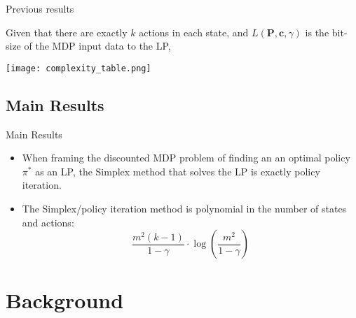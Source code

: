 \documentclass{beamer}
\renewcommand{\vec}[1]{\mathbf{#1}}
\begin{document}
\begin{frame}{Previous results}

Given that there are exactly $k$ actions in each state, and $L(\vec{P},\vec{c},\gamma)$ is the bit-size of the MDP input data to the LP, 
\begin{center}
\texttt{[image: complexity\_table.png]}
\end{center}
\end{frame}

\subsection{Main Results}
\begin{frame}{Main Results}
\begin{itemize}
\item When framing the discounted MDP problem of finding an an optimal policy $\pi^*$ as an LP, the Simplex method that solves the LP is exactly policy iteration. 
\item The Simplex/policy iteration method is polynomial in the number of states and actions:
$$\frac{m^2(k-1)}{1-\gamma}\cdot\log\left(\frac{m^2}{1-\gamma}\right)$$
\end{itemize}
\end{frame}


\section{Background}

\end{document}

